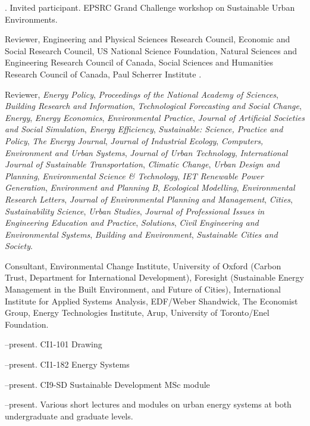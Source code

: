 \documentclass[11pt,a4paper]{article}
\begin{document}
. Invited participant.  EPSRC Grand Challenge workshop on Sustainable Urban Environments.

\ind Reviewer, Engineering and Physical Sciences Research Council, Economic and Social Research Council, US National Science Foundation, Natural Sciences and Engineering Research Council of Canada, Social Sciences and Humanities Research Council of Canada, Paul Scherrer Institute .

\ind Reviewer, \emph{Energy Policy}, \emph{Proceedings of the National Academy of Sciences}, \emph{Building Research and Information}, \emph{Technological Forecasting and Social Change}, \emph{Energy}, \emph{Energy Economics}, \emph{Environmental Practice}, \emph{Journal of Artificial Societies and Social Simulation}, \emph{Energy Efficiency}, \emph{Sustainable: Science, Practice and Policy}, \emph{The Energy Journal}, \emph{Journal of Industrial Ecology}, \emph{Computers, Environment and Urban Systems}, \emph{Journal of Urban Technology}, \emph{International Journal of Sustainable Transportation}, \emph{Climatic Change}, \emph{Urban Design and Planning}, \emph{Environmental Science \& Technology}, \emph{IET Renewable Power Generation}, \emph{Environment and Planning B}, \emph{Ecological Modelling}, \emph{Environmental Research Letters}, \emph{Journal of Environmental Planning and Management}, \emph{Cities}, \emph{Sustainability Science}, \emph{Urban Studies}, \emph{Journal of Professional Issues in Engineering Education and Practice}, \emph{Solutions}, \emph{Civil Engineering and Environmental Systems}, \emph{Building and Environment}, \emph{Sustainable Cities and Society}.

\ind Consultant, Environmental Change Institute, University of Oxford (Carbon Trust, Department for International Development), Foresight (Sustainable Energy Management in the Built Environment, and Future of Cities), International Institute for Applied Systems Analysis, EDF/Weber Shandwick, The Economist Group, Energy Technologies Institute, Arup, University of Toronto/Enel Foundation.
\bigskip%

\newpage
\noindent{}%
%
--present.  CI{1-101} Drawing

--present.  CI{1-182} Energy Systems

--present.  CI{9-SD} Sustainable Development MSc module

--present. Various short lectures and modules on urban energy systems at both undergraduate and graduate levels.
 
\end{document}
